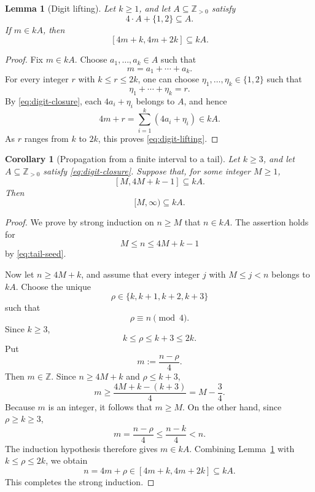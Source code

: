\documentclass[12pt]{article}
\theoremstyle{plain}
\newtheorem{lemma}[theorem]{Lemma}
\newtheorem{corollary}[theorem]{Corollary}
\theoremstyle{definition}
\theoremstyle{plain}
\begin{document}
\begin{lemma}[Digit lifting]\label{lem:digit-lifting}
Let $k\geq1$, and let $A\subseteq\mathbb Z_{>0}$ satisfy
\begin{equation}\label{eq:digit-closure}
 4\cdot A+\{1,2\}\subseteq A.
\end{equation}
If $m\in kA$, then
\begin{equation}\label{eq:digit-lifting}
 [4m+k,4m+2k]\subseteq kA.
\end{equation}
\end{lemma}

\begin{proof}
Fix $m\in kA$.  Choose $a_1,\ldots,a_k\in A$ such that
\[
 m=a_1+\cdots+a_k.
\]
For every integer $r$ with $k\leq r\leq2k$, one can choose
$\eta_1,\ldots,\eta_k\in\{1,2\}$ such that
\[
 \eta_1+\cdots+\eta_k=r.
\]
By \eqref{eq:digit-closure}, each $4a_i+\eta_i$ belongs to $A$, and hence
\[
 4m+r
 =\sum_{i=1}^{k}(4a_i+\eta_i)
 \in kA.
\]
As $r$ ranges from $k$ to $2k$, this proves
\eqref{eq:digit-lifting}.
\end{proof}

\begin{corollary}[Propagation from a finite interval to a tail]
\label{cor:tail-propagation}
Let $k\geq3$, and let $A\subseteq\mathbb Z_{>0}$ satisfy
\eqref{eq:digit-closure}.  Suppose that, for some integer $M\geq1$,
\begin{equation}\label{eq:tail-seed}
 [M,4M+k-1]\subseteq kA.
\end{equation}
Then
\[
 [M,\infty)\subseteq kA.
\]
\end{corollary}

\begin{proof}
We prove by strong induction on $n\geq M$ that $n\in kA$.
The assertion holds for
\[
 M\leq n\leq4M+k-1
\]
by \eqref{eq:tail-seed}.

Now let $n\geq4M+k$, and assume that every integer $j$ with
$M\leq j<n$ belongs to $kA$.  Choose the unique
\[
 \rho\in\{k,k+1,k+2,k+3\}
\]
such that
\[
 \rho\equiv n\pmod4.
\]
Since $k\geq3$,
\[
 k\leq\rho\leq k+3\leq2k.
\]
Put
\[
 m:=\frac{n-\rho}{4}.
\]
Then $m\in\mathbb Z$.  Since $n\geq4M+k$ and $\rho\leq k+3$,
\[
 m\geq\frac{4M+k-(k+3)}4=M-\frac34.
\]
Because $m$ is an integer, it follows that $m\geq M$.  On the other hand,
since $\rho\geq k\geq3$,
\[
 m=\frac{n-\rho}{4}
 \leq\frac{n-k}{4}
 <n.
\]
The induction hypothesis therefore gives $m\in kA$.  Combining
Lemma~\ref{lem:digit-lifting} with $k\leq\rho\leq2k$, we obtain
\[
 n=4m+\rho
 \in[4m+k,4m+2k]
 \subseteq kA.
\]
This completes the strong induction.
\end{proof}
\end{document}
